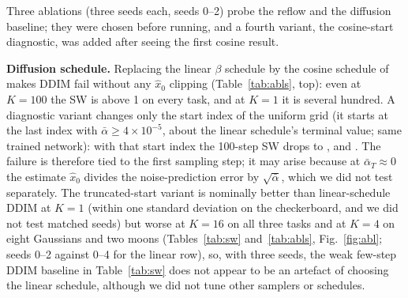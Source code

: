 Three ablations (three seeds each, seeds 0--2) probe the reflow and the diffusion baseline; they were chosen before running, and a fourth variant, the cosine-start diagnostic, was added after seeing the first cosine result.

\textbf{Diffusion schedule.} Replacing the linear $\beta$ schedule by the cosine schedule of~\cite{nichol2021improved} makes DDIM fail without any $\hat x_0$ clipping (Table~\ref{tab:abls}, top): even at $K{=}100$ the SW is above 1 on every task, and at $K{=}1$ it is several hundred. A diagnostic variant changes only the start index of the uniform grid (it starts at the last index with $\bar\alpha\ge4\times10^{-5}$, about the linear schedule's terminal value; same trained network): with that start index the 100-step SW drops to ,  and . The failure is therefore tied to the first sampling step; it may arise because at $\bar\alpha_T\approx0$ the estimate $\hat x_0$ divides the noise-prediction error by $\sqrt{\bar\alpha}$, which we did not test separately. The truncated-start variant is nominally better than linear-schedule DDIM at $K{=}1$ (within one standard deviation on the checkerboard, and we did not test matched seeds) but worse at $K{=}16$ on all three tasks and at $K{=}4$ on eight Gaussians and two moons (Tables~\ref{tab:sw} and~\ref{tab:abls}, Fig.~\ref{fig:abl}; seeds 0--2 against 0--4 for the linear row), so, with three seeds, the weak few-step DDIM baseline in Table~\ref{tab:sw} does not appear to be an artefact of choosing the linear schedule, although we did not tune other samplers or schedules.

\begin{table}[t]\centering\caption{Ablations (mean $\pm$ std over seeds 0--2). Top: cosine-schedule DDIM with and without the truncated start. Bottom: reflow with a 4-step teacher and a second reflow round (compare with Reflow-1 in Table~\ref{tab:sw}).}\label{tab:abls}
\footnotesize\resizebox{0.75\textwidth}{!}{}\\[3pt]
\resizebox{0.75\textwidth}{!}{}\end{table}

